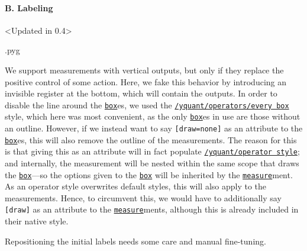\documentclass{scrartcl}
\makeatletter
\newenvironment{codeexample}{%
   \VerbatimEnvironment%
   \let\FVB@VerbatimOut\minted@FVB@VerbatimOut
   \let\FVE@VerbatimOut\minted@FVE@VerbatimOut
   \minted@configlang{tex}%
   \minted@fvset
   \begin{VerbatimOut}[codes={\catcode`\^^I=12},firstline,lastline]{\minted@jobname.pyg}%
}{
   \end{VerbatimOut}%
   \minted@langlinenoson%
   \savebox\codeexamplebox{ \minted@jobname.pyg}%
   \ifdim\wd\codeexamplebox>\dimexpr.5\linewidth-3mm\relax%
      \wd\codeexamplebox=.5\linewidth%
   \else%
      \wd\codeexamplebox=\dimexpr\wd\codeexamplebox+3mm\relax%
   \fi%
   \noindent\begin{minipage}{\wd\codeexamplebox}%
      \centering%
      \usebox\codeexamplebox%
   \end{minipage}%
   \begin{minipage}{\dimexpr\linewidth-\wd\codeexamplebox\relax}%
      \minted@pygmentize{\minted@lang}%
   \end{minipage}%
   \minted@langlinenosoff%
   \par%
}
\def\gate#1{\hyperref[gate:#1]{\texttt{#1}}}
\def\style#1{\hyperref[style:#1]{\texttt{#1}}}
\makeatother
\begin{document}
            \paragraph{B. Labeling}\leavevmode
               \begin{example}<Updated in 0.4>
                  \begin{codeexample}
                  \end{codeexample}
                  We support measurements with vertical outputs, but only if they replace the positive control of some action.
                  Here, we fake this behavior by introducing an invisible register at the bottom, which will contain the outputs.
                  In order to disable the line around the \gate{box}es, we used the \style{/yquant/operators/every box} style, which here was most convenient, as the only \gate{box}es in use are those without an outline.
                  However, if we instead want to say \texttt{[draw=none]} as an attribute to the \gate{box}es, this will also remove the outline of the measurements.
                  The reason for this is that giving this as an attribute will in fact populate \style{/yquant/operator style}; and internally, the measurement will be nested within the same scope that draws the \gate{box}---so the options given to the \gate{box} will be inherited by the \gate{measure}ment.
                  As an operator style overwrites default styles, this will also apply to the measurements.
                  Hence, to circumvent this, we would have to additionally say \texttt{[draw]} as an attribute to the \gate{measure}ments, although this is already included in their native style.

                  Repositioning the initial labels needs some care and manual fine\hyp tuning.
               \end{example}
\end{document}
